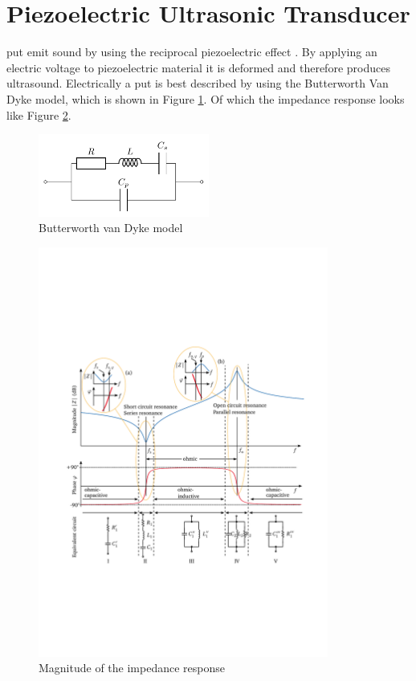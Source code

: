 \section{Piezoelectric Ultrasonic Transducer}
\acrfull{put} emit sound by using the reciprocal piezoelectric effect \cite{air_coupled_ultraonic}. By applying an electric voltage to piezoelectric material it is deformed and therefore produces ultrasound. Electrically a \acrshort{put} is best described by using the Butterworth Van Dyke model, which is shown in Figure \ref{2_fig:butt_dyke_model}.
Of which the impedance response looks like Figure \ref{2_fig:impedance_put}.
\begin{figure}[h!]
    \centering
    \includegraphics[width=0.5\textwidth]{sections/Van_Dyke_Circuit.pdf}
    \caption{Butterworth van Dyke model}
    \label{2_fig:butt_dyke_model}
\end{figure}
\begin{figure}
    \centering
    \includegraphics[width=0.85\textwidth]{images/2_Preliminaries/Impedance_PUT.pdf}
    \caption{Magnitude of the impedance response \cite{air_coupled_ultraonic}}
    \label{2_fig:impedance_put}
\end{figure}


